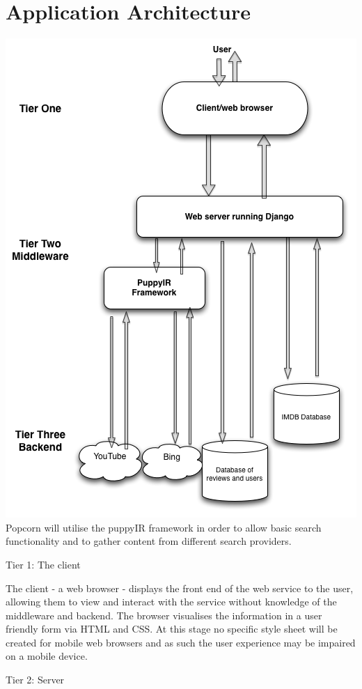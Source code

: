 \documentclass{sig-alt-release2}
\begin{document}
\section{Application Architecture}
\includegraphics[scale=0.4]{tier.png}
Popcorn will utilise the puppyIR framework in order to allow basic search functionality and to gather content from different search providers. 
 
Tier 1: The client 
 
The client - a web browser - displays the front end of the web service to the user, allowing them to view and interact with the service without knowledge of the middleware and backend. The browser visualises the information in a user friendly form via HTML and CSS. At this stage no specific style sheet will be created for mobile web browsers and as such the user experience may be impaired on a mobile device. 
 
Tier 2: Server 
 
\end{document}
